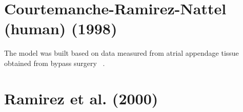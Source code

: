 \section{Courtemanche-Ramirez-Nattel (human) (1998)}
\label{sec:court-ramir-natt}

The model was built based on data measured from atrial appendage
tissue obtained from bypass surgery ~\citep{courtemanche1998imu}.

\section{Ramirez et al. (2000)}
\label{sec:Ramirez_2000}

\citep{ramirez2000}


